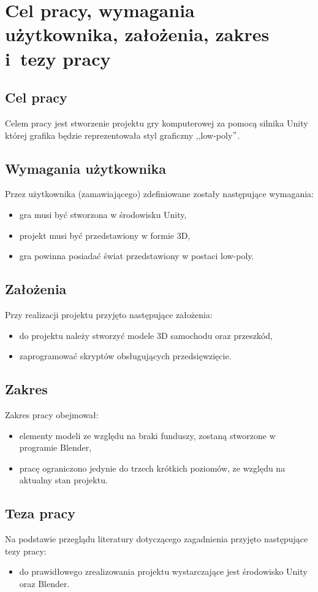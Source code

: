 \chapter{Cel pracy, wymagania użytkownika, założenia, zakres i~tezy pracy}
\section{Cel pracy}\label{cel}
Celem pracy jest stworzenie projektu gry komputerowej za pomocą silnika Unity której grafika będzie reprezentowała styl graficzny ,,low-poly$"$.

\section{Wymagania użytkownika}
Przez użytkownika (zamawiającego) zdefiniowane zostały następujące wymagania:
\begin{itemize}
\item gra musi być stworzona w środowisku Unity,
\item projekt musi być przedstawiony w formie 3D,
\item gra powinna posiadać świat przedstawiony w postaci low-poly.
\end{itemize}
\section{Założenia}
Przy realizacji projektu przyjęto następujące założenia:
\begin{itemize}
\item do projektu należy stworzyć modele 3D samochodu oraz przeszkód,
\item zaprogramować skryptów obsługujących przedsięwzięcie.
\end{itemize}
\section{Zakres}
Zakres pracy obejmował:
\begin{itemize}
\item elementy modeli ze względu na braki funduszy, zostaną stworzone w programie Blender,
\item pracę ograniczono jedynie do trzech krótkich poziomów, ze względu na aktualny stan projektu.
\end{itemize}
\section{Teza pracy}
Na podstawie przeglądu literatury dotyczącego zagadnienia przyjęto następujące tezy pracy:
\begin{itemize}
  \item do prawidłowego zrealizowania projektu wystarczające jest środowisko Unity oraz Blender.
\end{itemize}
